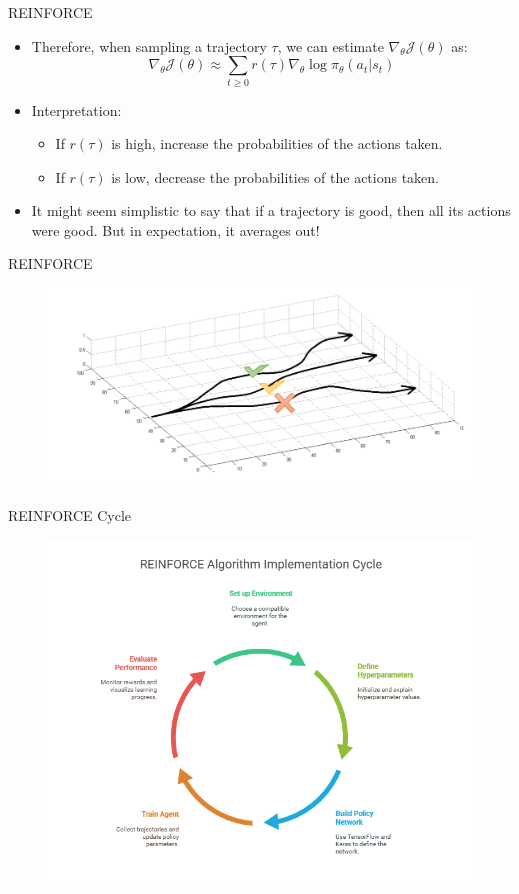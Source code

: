 \begin{frame}{REINFORCE}
\begin{itemize}
    \item Therefore, when sampling a trajectory $\tau$, we can estimate $\nabla_\theta \mathcal{J}(\theta)$ as:
    $$
    \nabla_\theta \mathcal{J}(\theta) \approx \sum_{t \geq 0} r(\tau) \nabla_\theta \log \pi_\theta(a_t|s_t)
    $$
    \pause
    \item Interpretation:
    \begin{itemize}
        \item If $r(\tau)$ is high, increase the probabilities of the actions taken.
        \item If $r(\tau)$ is low, decrease the probabilities of the actions taken.
    \end{itemize}
    \pause
    \item It might seem simplistic to say that if a trajectory is good, then all its actions were good. But in expectation, it averages out!
\end{itemize}
\end{frame}

\begin{frame}{REINFORCE}
    \begin{figure}
        \centering
        \includegraphics[width=\textwidth,height=0.9\textheight,keepaspectratio]{images/policygrad+reinforce+actor/reinforce.png}
    \end{figure}
\end{frame}

\begin{frame}{REINFORCE Cycle}
    \begin{figure}
        \centering
        \includegraphics[width=\textwidth,height=0.92\textheight,keepaspectratio]{images/policygrad+reinforce+actor/reinforce_cycle.png}
    \end{figure}
\end{frame}